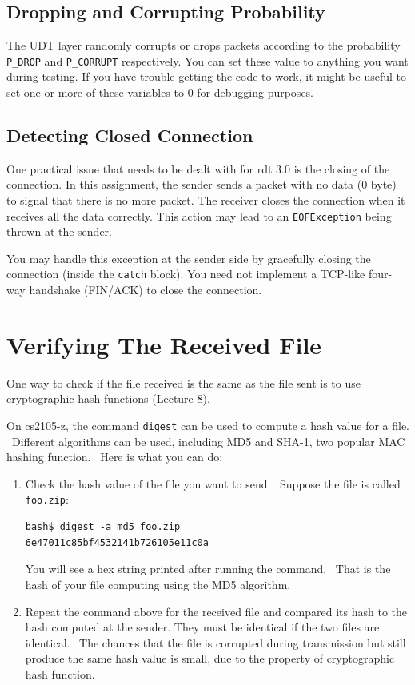 \documentclass[a4paper,11pt]{exam}
\begin{document}
\subsection*{Dropping and Corrupting Probability}

The UDT layer randomly corrupts or drops packets according to the probability \texttt{P\_DROP} and \texttt{P\_CORRUPT} respectively.  You can set these value to anything you want during testing.  If you have trouble getting the code to work, it might be useful to set one or more of these variables to 0 for debugging purposes.

\subsection*{Detecting Closed Connection}
One practical issue that needs to be dealt with for rdt 3.0 is the closing of the connection.  In this assignment, the sender sends a packet with no data (0 byte) to signal that there is no more packet.  The receiver closes the connection when it receives all the data correctly.  This action may lead to an \texttt{EOFException} being thrown at the sender.

You may handle this exception at the sender side by gracefully closing the connection (inside the \texttt{catch} block). You need not implement a TCP-like four-way handshake (FIN/ACK) to close the connection.

\section*{Verifying The Received File}
One way to check if the file received is the same as the file sent is to use cryptographic hash functions (Lecture 8).

On cs2105-z, the command \texttt{digest} can be used to compute a hash value for a file.  Different algorithms can be used, including MD5 and SHA-1, two popular MAC hashing function.  Here is what you can do:
\begin{enumerate}
\item Check the hash value of the file you want to send.  Suppose the file is called \texttt{foo.zip}:
\begin{verbatim}
bash$ digest -a md5 foo.zip
6e47011c85bf4532141b726105e11c0a
\end{verbatim}
You will see a hex string printed after running the command.  That is the hash of your file computing using the MD5 algorithm.

\item Repeat the command above for the received file and compared its hash to the hash computed at the sender.  They must be identical if the two files are identical.  The chances that the file is corrupted during transmission but still produce the same hash value is small, due to the property of cryptographic hash function.
\end{enumerate}
\end{document}
